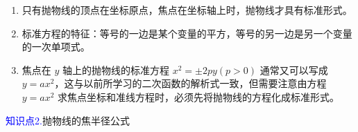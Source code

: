 \documentclass{article}
\begin{document}
\begin{tcolorbox}[colback=blue!10,colframe=blue!70!black,title=]
\begin{enumerate}
    \item 只有抛物线的顶点在坐标原点，焦点在坐标轴上时，抛物线才具有标准形式。
    \item 标准方程的特征：等号的一边是某个变量的平方，等号的另一边是另一个变量的一次单项式。
    \item 焦点在 $y$ 轴上的抛物线的标准方程 $x^2 = \pm 2py(p>0)$ 通常又可以写成 $y=ax^2$，这与以前所学习的二次函数的解析式一致，但需要注意由方程 $y=ax^2$ 求焦点坐标和准线方程时，必须先将抛物线的方程化成标准形式。
\end{enumerate}
\end{tcolorbox}
 \vspace{1\baselineskip}

\textcolor{blue}{知识点2.}抛物线的焦半径公式
\end{document}
